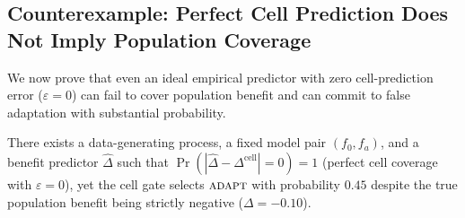 \subsection{Counterexample: Perfect Cell Prediction Does Not Imply Population Coverage}
\label{app:cell-counterexample}

We now prove that even an ideal empirical predictor with zero cell-prediction error ($\varepsilon = 0$) can
fail to cover population benefit and can commit to false adaptation with substantial probability.

\begin{proposition}\label{prop:cell-fail}
There exists a data-generating process, a fixed model pair $(f_0, f_a)$, and a benefit predictor $\widehat\Delta$
such that $\Pr(|\widehat\Delta - \Delta^{\mathrm{cell}}| = 0) = 1$ (perfect cell coverage with $\varepsilon = 0$),
yet the cell gate selects $\textnormal{\textsc{adapt}}$ with probability $0.45$ despite the true population benefit being strictly
negative ($\Delta = -0.10$).
\end{proposition}

